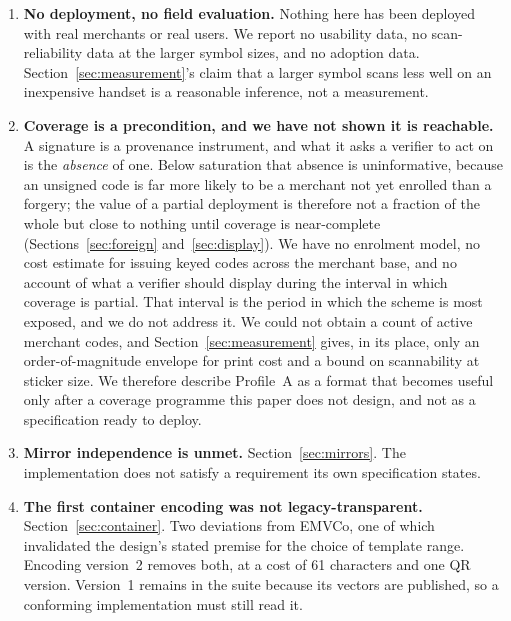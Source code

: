 \documentclass[10pt,a4paper,twocolumn]{article}
\begin{document}
\begin{enumerate}[leftmargin=1.6em]
  \item \textbf{No deployment, no field evaluation.} Nothing here has been
    deployed with real merchants or real users. We report no usability data, no
    scan-reliability data at the larger symbol sizes, and no adoption data.
    Section~\ref{sec:measurement}'s claim that a larger symbol scans less well on
    an inexpensive handset is a reasonable inference, not a measurement.

  \item \textbf{Coverage is a precondition, and we have not shown it is
    reachable.} A signature is a provenance instrument, and what it asks a
    verifier to act on is the \emph{absence} of one. Below saturation that
    absence is uninformative, because an unsigned code is far more likely to be
    a merchant not yet enrolled than a forgery; the value of a partial
    deployment is therefore not a fraction of the whole but close to nothing
    until coverage is near-complete (Sections~\ref{sec:foreign}
    and~\ref{sec:display}). We have no enrolment model, no cost estimate for
    issuing keyed codes across the merchant base, and no account of what a
    verifier should display during the interval in which coverage is partial.
    That interval is the period in which the scheme is most exposed, and we do
    not address it. We could not obtain a count of active merchant codes, and
    Section~\ref{sec:measurement} gives, in its place, only an order-of-magnitude
    envelope for print cost and a bound on scannability at sticker size. We
    therefore describe Profile~A as a format that becomes useful only after a
    coverage programme this paper does not design, and not as a specification
    ready to deploy.

  \item \textbf{Mirror independence is unmet.} Section~\ref{sec:mirrors}. The
    implementation does not satisfy a requirement its own specification states.

  \item \textbf{The first container encoding was not legacy-transparent.}
    Section~\ref{sec:container}. Two deviations from EMVCo, one of which
    invalidated the design's stated premise for the choice of template range.
    Encoding version~2 removes both, at a cost of 61 characters and one QR
    version. Version~1 remains in the suite because its vectors are published,
    so a conforming implementation must still read it.


\end{enumerate}
\end{document}
